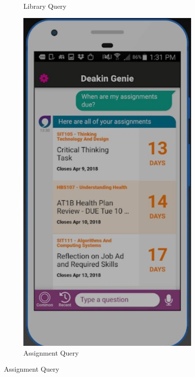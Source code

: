 \documentclass{l4proj}
\begin{document}
\begin{figure}[ht]
\begin{subfigure}[b]{0.22\textwidth}
    \caption{Library Query}
  \end{subfigure}
  \hfill %
  \begin{subfigure}[b]{0.22\textwidth}
    \includegraphics[width=\textwidth]{images/genie1.jpeg}
    \caption{Assignment Query}
  \end{subfigure}

\end{figure}
\end{document}
